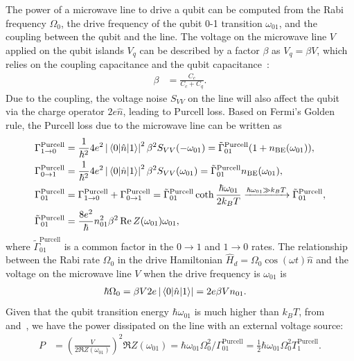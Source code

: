 \documentclass[a4paper,onecolumn,11pt,unpublished]{quantumarticle}
\newcommand{\nBE}{n_{\mathrm{BE}}}
\newcommand{\Purcell}{\mathrm{Purcell}}
\newcommand{\TPurcell}{T_1^{\Purcell}}
\newcommand{\Decay}[3]{\Gamma^{#3}_{{#1}\rightarrow{#2}}}
\newcommand{\DecaySum}[3]{\Gamma^{#3}_{{#1 #2}}}
\newcommand{\DecayBase}[3]{\tilde{\Gamma}^{#3}_{#1 #2}}
\newcommand{\melabs}[3]{\left|\mel{#1}{#2}{#3}\right|}
\begin{document}
The power of a microwave line to drive a qubit can be computed from the Rabi frequency $\Omega_0$, the drive frequency of the qubit 0-1 transition $\omega_{01}$, and the coupling between the qubit and the line. The voltage on the microwave line $V$ applied on the qubit islands $V_q$ can be described by a factor $\beta$ as $V_q=\beta V$, which relies on the coupling capacitance and the qubit capacitance~\cite{Rasmussen2021Superconducting}:
\begin{align}
  \beta & = \frac{C_c}{C_c+C_q}. \label{eq:ratio_voltage_line_qubit}
\end{align}
Due to the coupling, the voltage noise $S_{VV}$ on the line will also affect the qubit via the charge operator $2e\hat{n}$, leading to Purcell loss. Based on Fermi's Golden rule, the Purcell loss due to the microwave line can be written as~\cite{Pechal2016Microwave}
\begin{align}
  \Decay{1}{0}{\Purcell}     & = \frac{1}{\hbar^2}4e^2 \melabs{0}{\hat{n}}{1}^2 \beta^2 S_{VV}(-\omega_{01}) = \DecayBase{0}{1}{\Purcell} (1+\nBE(\omega_{01})) , \label{eq:purcell_drive_10}                                                         \\
  \Decay{0}{1}{\Purcell}     & = \frac{1}{\hbar^2}4e^2 \melabs{0}{\hat{n}}{1}^2 \beta^2 S_{VV}(\omega_{01}) = \DecayBase{0}{1}{\Purcell} \nBE(\omega_{01}), \label{eq:purcell_drive_01}                                                               \\
  \DecaySum{0}{1}{\Purcell}  & = \Decay{1}{0}{\Purcell} + \Decay{0}{1}{\Purcell} = \DecayBase{0}{1}{\Purcell}\coth{\frac{\hbar\omega_{01}}{2k_BT}} \xrightarrow{\hbar\omega_{01}\gg k_BT} \DecayBase{0}{1}{\Purcell}, \label{eq:purcell_drive_01_sum} \\
  \DecayBase{0}{1}{\Purcell} & = \frac{8e^2}{\hbar} n_{01}^2 \beta^2 \Re Z(\omega_{01})\omega_{01}, \label{eq:purcell_drive_base}
\end{align}
where $\DecayBase{0}{1}{\Purcell}$ is a common factor in the $0\rightarrow 1$ and $1\rightarrow 0$ rates.
The relationship between the Rabi rate $\Omega_0$ in the drive Hamiltonian $\hat{H}_d=\Omega_0\cos(\omega t)\hat{n}$ and the voltage on the microwave line $V$ when the drive frequency is $\omega_{01}$ is
\begin{align}
  \hbar\Omega_0 & = \beta V2e\melabs{0}{\hat{n}}{1}= 2e\beta V n_{01}. \label{eq:rabi_voltage}
\end{align}
Given that the qubit transition energy $\hbar\omega_{01}$ is much higher than $k_B T$, from~ and~, we have the power dissipated on the line with an external voltage source:
\begin{align}
  P & = \left(\frac{V}{2\Re Z(\omega_{01})}\right)^2 \Re Z(\omega_{01}) = \hbar \omega_{01} \Omega_0^2 / \DecaySum{0}{1}{\Purcell} = \frac{1}{2}\hbar \omega_{01} \Omega_0^2 \TPurcell. \label{eq:microwave_line_rabi_purcell}
\end{align}
\end{document}
